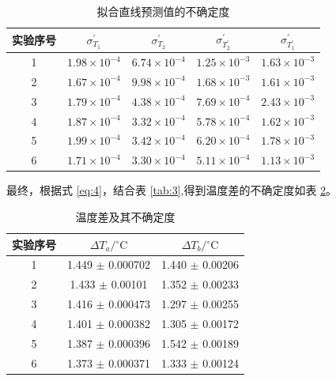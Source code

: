 \documentclass[cn,hazy,pku,12pt,normal,math=newtx,cite=super]{elegantnote}
\begin{document}
\begin{table}[htbp]
    \centering
    \caption{拟合直线预测值的不确定度}
    \begin{tabular}{ccccc}
        \toprule
        实验序号 & $\sigma_{T_1}^\prime$ & $\sigma_{T_2}^\prime$ & $\sigma_{T_2^\prime}^\prime$ & $\sigma_{T_1^\prime}^\prime$ \\
        \midrule
        1 & $1.98 \times 10^{-4}$ & $6.74 \times 10^{-4}$ & $1.25 \times 10^{-3}$ & $1.63 \times 10^{-3}$ \\
        2 & $1.67 \times 10^{-4}$ & $9.98 \times 10^{-4}$ & $1.68 \times 10^{-3}$ & $1.61 \times 10^{-3}$ \\
        3 & $1.79 \times 10^{-4}$ & $4.38 \times 10^{-4}$ & $7.69 \times 10^{-4}$ & $2.43 \times 10^{-3}$ \\
        4 & $1.87 \times 10^{-4}$ & $3.32 \times 10^{-4}$ & $5.78 \times 10^{-4}$ & $1.62 \times 10^{-3}$ \\
        5 & $1.99 \times 10^{-4}$ & $3.42 \times 10^{-4}$ & $6.20 \times 10^{-4}$ & $1.78 \times 10^{-3}$ \\
        6 & $1.71 \times 10^{-4}$ & $3.30 \times 10^{-4}$ & $5.11 \times 10^{-4}$ & $1.13 \times 10^{-3}$ \\
        \bottomrule
    \end{tabular}
    \label{tab:11}
\end{table}

最终，根据式 \eqref{eq:4}，结合表 \ref{tab:3},得到温度差的不确定度如表 \ref{tab:12}。

\begin{table}[htbp]
    \centering
    \caption{温度差及其不确定度}
    \begin{tabular}{ccc}
        \toprule
        实验序号 & $\Delta T_a/\mathrm{{}^\circ C}$ & $\Delta T_b/\mathrm{{}^\circ C}$ \\
        \midrule
        1 & 1.449 $\pm$ 0.000702 & 1.440 $\pm$ 0.00206 \\
        2 & 1.433 $\pm$ 0.00101 & 1.352 $\pm$ 0.00233 \\
        3 & 1.416 $\pm$ 0.000473 & 1.297 $\pm$ 0.00255 \\
        4 & 1.401 $\pm$ 0.000382 & 1.305 $\pm$ 0.00172 \\
        5 & 1.387 $\pm$ 0.000396 & 1.542 $\pm$ 0.00189 \\
        6 & 1.373 $\pm$ 0.000371 & 1.333 $\pm$ 0.00124 \\
        \bottomrule
    \end{tabular}
    \label{tab:12}
\end{table}
\end{document}
